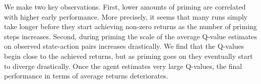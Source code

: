 We make two key observations. First, lower amounts of priming are correlated with higher early performance. More precisely, it seems that many runs simply take longer before they start achieving non-zero returns as the number of priming steps increases. Second, during priming the scale of the average Q-value estimates on observed state-action pairs increases drastically. We find that the Q-values begin close to the achieved returns, but as priming goes on they eventually start to diverge drastically. Once the agent estimates very large Q-values, the final performance in terms of average returns deteriorates. 

